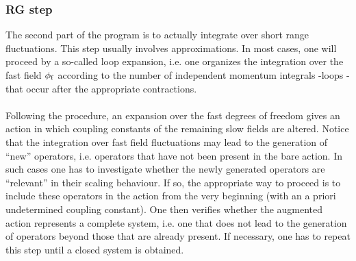\subsubsection{RG step}
The second part of the program is to actually integrate over short range fluctuations. This step usually involves approximations. 
In most cases, one will proceed by a so-called loop expansion, i.e. one organizes the integration over the fast field $\phi_{\rm f}$ according to the number of independent momentum integrals -loops - that occur after the appropriate contractions.
\\ \\
Following the procedure, an expansion over the fast degrees of freedom gives an action in which coupling constants of the remaining slow fields are altered. 
Notice that the integration over fast field fluctuations may  lead to the generation of ``new'' operators, i.e. operators that have not been present in the bare action. In such cases one has to investigate whether the newly generated operators are ``relevant'' in their scaling behaviour. 
If so, the appropriate way to proceed is to include these operators in the action from the very beginning (with an a priori undetermined coupling constant). One then verifies whether the augmented action represents a complete system, i.e. one that does not lead to the generation of operators beyond those that are already present. If necessary, one has to repeat this step until a closed system is obtained.

